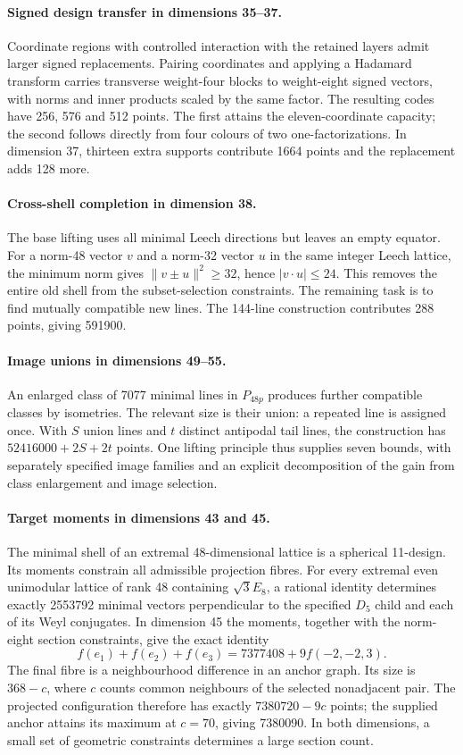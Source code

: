 \paragraph{Signed design transfer in dimensions 35--37.}
Coordinate regions with controlled interaction with the retained layers
admit larger signed replacements. Pairing coordinates and applying a
Hadamard transform carries transverse weight-four blocks to
weight-eight signed vectors, with norms and inner products scaled by
the same factor. The resulting codes have 256, 576 and 512 points.
The first attains the eleven-coordinate capacity; the second follows
directly from four colours of two one-factorizations. In dimension 37,
thirteen extra supports contribute 1664 points and the replacement
adds 128 more.

\paragraph{Cross-shell completion in dimension 38.}
The base lifting uses all minimal Leech directions but leaves an empty
equator. For a norm-48 vector $v$ and a norm-32 vector $u$ in the same
integer Leech lattice, the minimum norm gives
$\|v\pm u\|^2\ge32$, hence $|v\cdot u|\le24$.
This removes the entire old shell from the subset-selection constraints.
The remaining task is to find mutually compatible new lines.
The 144-line construction contributes 288 points, giving 591900.

\paragraph{Image unions in dimensions 49--55.}
An enlarged class of 7077 minimal lines in $P_{48p}$ produces further
compatible classes by isometries. The relevant size is their union:
a repeated line is assigned once. With $S$ union lines and $t$ distinct
antipodal tail lines, the construction has $52416000+2S+2t$ points.
One lifting principle thus supplies seven bounds, with separately
specified image families and an explicit decomposition of the gain
from class enlargement and image selection.

\paragraph{Target moments in dimensions 43 and 45.}
The minimal shell of an extremal 48-dimensional lattice is a spherical
11-design. Its moments constrain all admissible projection fibres.
For every extremal even unimodular lattice of rank 48 containing
$\sqrt3E_8$, a rational identity determines exactly 2553792 minimal
vectors perpendicular to the specified $D_5$ child and each of its
Weyl conjugates. In dimension 45 the moments, together with the
norm-eight section constraints, give the exact identity
\[
f(e_1)+f(e_2)+f(e_3)=7377408+9f(-2,-2,3).
\]
The final fibre is a neighbourhood difference in an anchor graph.
Its size is $368-c$, where $c$ counts common neighbours of the selected
nonadjacent pair. The projected configuration therefore has exactly
$7380720-9c$ points; the supplied anchor attains its maximum at $c=70$,
giving 7380090. In both dimensions, a small set of geometric constraints
determines a large section count.

